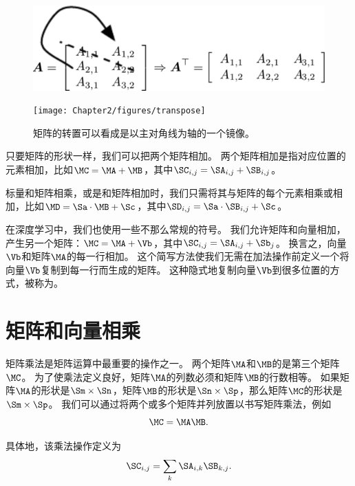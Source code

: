 \begin{figure}[!hbt]
\ifOpenSource
\centerline{\includegraphics[scale=0.5]{images/13.png}}
\else
\centerline{\texttt{[image: Chapter2/figures/transpose]}}
\fi
\caption{矩阵的转置可以看成是以主对角线为轴的一个镜像。}
\label{fig:chap2_transpose}
\end{figure}


只要矩阵的形状一样，我们可以把两个矩阵相加。
两个矩阵相加是指对应位置的元素相加，比如$\MC=\MA+\MB$，其中$\SC_{i,j}= \SA_{i,j}+\SB_{i,j}$。


标量和矩阵相乘，或是和矩阵相加时，我们只需将其与矩阵的每个元素相乘或相加，比如$\MD = \Sa \cdot \MB + \Sc$，其中$\SD_{i,j} = \Sa\cdot  \SB_{i,j} + \Sc$。


在深度学习中，我们也使用一些不那么常规的符号。
我们允许矩阵和向量相加，产生另一个矩阵：$\MC=\MA + \Vb$，其中$\SC_{i,j}= \SA_{i,j} + \Sb_{j}$。
换言之，向量$\Vb$和矩阵$\MA$的每一行相加。
这个简写方法使我们无需在加法操作前定义一个将向量$\Vb$复制到每一行而生成的矩阵。
这种隐式地复制向量$\Vb$到很多位置的方式，被称为。




\section{矩阵和向量相乘}
\label{sec:multiplying_matrices_and_vectors}

矩阵乘法是矩阵运算中最重要的操作之一。
两个矩阵$\MA$和$\MB$的是第三个矩阵$\MC$。
为了使乘法定义良好，矩阵$\MA$的列数必须和矩阵$\MB$的行数相等。
如果矩阵$\MA$的形状是$\Sm \times \Sn$，矩阵$\MB$的形状是$\Sn\times \Sp$，那么矩阵$\MC$的形状是$\Sm\times \Sp$。
我们可以通过将两个或多个矩阵并列放置以书写矩阵乘法，例如
\begin{equation}
    \MC=\MA\MB.
\end{equation}


具体地，该乘法操作定义为
\begin{equation}
    \SC_{i,j}=\sum_k \SA_{i,k} \SB_{k,j}.
\end{equation}


